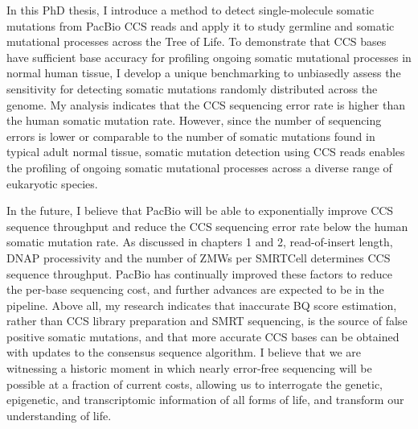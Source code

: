In this PhD thesis, I introduce a method to detect single-molecule somatic mutations from PacBio CCS reads and apply it to study germline and somatic mutational processes across the Tree of Life. To demonstrate that CCS bases have sufficient base accuracy for profiling ongoing somatic mutational processes in normal human tissue, I develop a unique benchmarking to unbiasedly assess the sensitivity for detecting somatic mutations randomly distributed across the genome. My analysis indicates that the CCS sequencing error rate is higher than the human somatic mutation rate. However, since the number of sequencing errors is lower or comparable to the number of somatic mutations found in typical adult normal tissue, somatic mutation detection using CCS reads enables the profiling of ongoing somatic mutational processes across a diverse range of eukaryotic species. 

In the future, I believe that PacBio will be able to exponentially improve CCS sequence throughput and reduce the CCS sequencing error rate below the human somatic mutation rate. As discussed in chapters 1 and 2, read-of-insert length, DNAP processivity and the number of ZMWs per SMRTCell determines CCS sequence throughput. PacBio has continually improved these factors to reduce the per-base sequencing cost, and further advances are expected to be in the pipeline. Above all, my research indicates that inaccurate BQ score estimation, rather than CCS library preparation and SMRT sequencing, is the source of false positive somatic mutations, and that more accurate CCS bases can be obtained with updates to the consensus sequence algorithm. I believe that we are witnessing a historic moment in which nearly error-free sequencing will be possible at a fraction of current costs, allowing us to interrogate the genetic, epigenetic, and transcriptomic information of all forms of life, and transform our understanding of life. 









